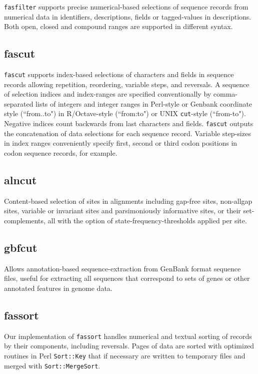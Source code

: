 \documentclass{frontiersSCNS} %
\begin{document}
{\tt fasfilter} supports precise numerical-based selections of
sequence records from numerical data in identifiers, descriptions, fields
or tagged-values in descriptions. Both open, closed and compound
ranges are supported in different syntax.

\subsection{fascut}

{\tt fascut} supports index-based selections of characters and fields
in sequence records allowing repetition, reordering, variable steps,
and reversals.  A sequence of selection indices and index-ranges are
specified conventionally by comma-separated lists of integers and
integer ranges in Perl-style or Genbank coordinate style (``from..to")
in R/Octave-style (``from:to") or UNIX {\tt cut}-style
(``from-to"). Negative indices count backwards from last characters and
fields. {\tt fascut} outputs the concatenation of data selections for
each sequence record.  Variable step-sizes in index ranges
conveniently specify first, second or third codon positions in codon
sequence records, for example.

\subsection{alncut}
Content-based selection of sites in alignments including gap-free
sites, non-allgap sites, variable or invariant sites and
parsimoniously informative sites, or their set-complements, all with
the option of state-frequency-thresholds applied per site.

\subsection{gbfcut} 

Allows annotation-based sequence-extraction from GenBank format
sequence files, useful for extracting all sequences that correspond to
sets of genes or other annotated features in genome data.

\subsection{fassort}

Our implementation of {\tt fassort} handles numerical and textual
sorting of records by their components, including reversals. Pages of data are sorted with
optimized routines in Perl {\tt Sort::Key} that if necessary are
written to temporary files and merged with {\tt Sort::MergeSort}.
\end{document}
